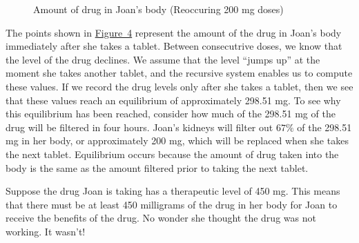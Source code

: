 \documentclass[10pt,]{book}
\theoremstyle{ptxdefinitionnotitle}
\theoremstyle{ptxdefinitiontitle}
\theoremstyle{ptxdefinitionnotitle}
\theoremstyle{ptxdefinitiontitle}
\theoremstyle{ptxdefinitionnotitle}
\theoremstyle{ptxdefinitiontitle}
\numberwithin{equation}{section}
\begin{document}
\begin{example}
\begin{figure}
\begin{sidebyside}{2}{0.0375}{0.0375}{0.075}
\begin{sbspanel}{0.65}
\end{sbspanel}
\end{sidebyside}
\caption{Amount of drug in Joan's body (Reoccuring 200 mg doses)\label{figure-ibuprofen-multi-dose}}
\end{figure}
\hypertarget{p-19}{}%
The points shown in \hyperref[figure-ibuprofen-multi-dose]{Figure~4} represent the amount of the drug in Joan’s body immediately after she takes a tablet.  Between consecutrive doses, we know that the level of the drug declines.  We assume that the level “jumps up” at the moment she takes another tablet, and the recursive system enables us to compute these values.   If we  record the drug levels only after she takes a tablet, then we see that these values reach an equilibrium of approximately 298.51 mg.  To see why this equilibrium has been reached, consider how much of the 298.51 mg of the drug will be filtered in four hours.  Joan’s kidneys will filter out \(67\%\) of the 298.51 mg in her body, or approximately 200 mg, which will be replaced when she takes the next tablet. Equilibrium occurs because the amount of drug taken into the body is the same as the amount filtered prior to taking the next tablet.%
\par
\hypertarget{p-20}{}%
Suppose the drug Joan is taking has a therapeutic level of 450 mg.  This means that there must be at least 450 milligrams of the drug in her body for Joan to receive the benefits of the drug.  No wonder she thought the drug was not working.  It wasn’t!%
\end{example}
\typeout{************************************************}
\typeout{************************************************}
\end{document}
